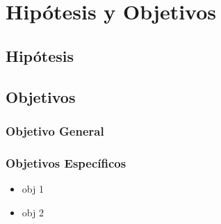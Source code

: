 \chapter{Hipótesis y Objetivos}
\label{hipo}

\section{Hipótesis}




\section{Objetivos}

\subsection{Objetivo General}

\subsection{Objetivos Específicos}
\begin{itemize}
	
	\item obj 1
	\item obj 2
	
\end{itemize}



